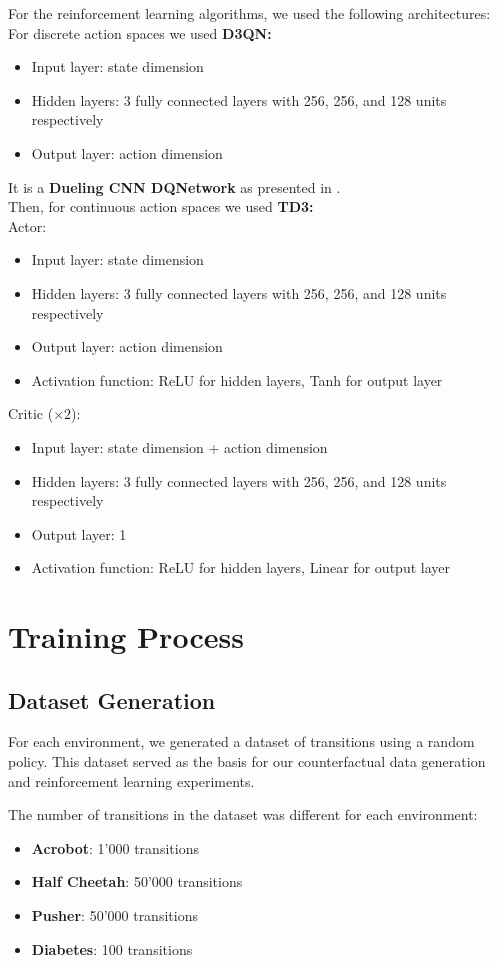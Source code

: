 For the reinforcement learning algorithms, we used the following architectures:\\
For discrete action spaces we used \textbf{D3QN:}
\begin{itemize}
    \item Input layer: state dimension
    \item Hidden layers: 3 fully connected layers with 256, 256, and 128 units respectively
    \item Output layer: action dimension
\end{itemize}
It is a \textbf{Dueling CNN DQNetwork} as presented in \cite{d3qn}.\\
Then, for continuous action spaces we used \textbf{TD3:}\\
Actor:
\begin{itemize}
    \item Input layer: state dimension
    \item Hidden layers: 3 fully connected layers with 256, 256, and 128 units respectively
    \item Output layer: action dimension
    \item Activation function: ReLU for hidden layers, Tanh for output layer
\end{itemize}
Critic ($\times 2$):
\begin{itemize}
    \item Input layer: state dimension + action dimension
    \item Hidden layers: 3 fully connected layers with 256, 256, and 128 units respectively
    \item Output layer: 1
    \item Activation function: ReLU for hidden layers, Linear for output layer
\end{itemize}

\section{Training Process}

\subsection{Dataset Generation}

For each environment, we generated a dataset of transitions using a random policy.
This dataset served as the basis for our counterfactual
data generation and reinforcement learning experiments.

The number of transitions in the dataset was different for each environment:
\begin{itemize}
    \item \textbf{Acrobot}: 1'000 transitions
    \item \textbf{Half Cheetah}: 50'000 transitions
    \item \textbf{Pusher}: 50'000 transitions
    \item \textbf{Diabetes}: 100 transitions
\end{itemize}

